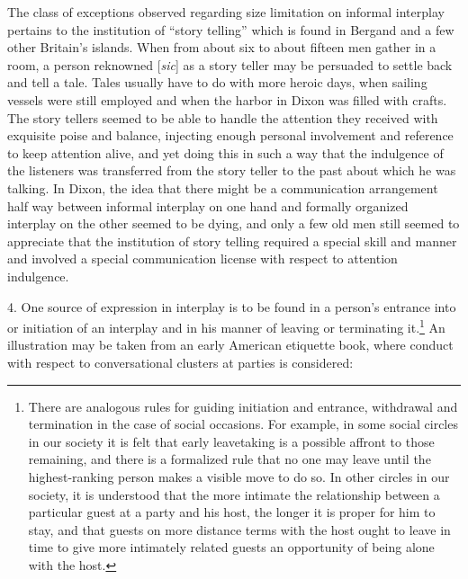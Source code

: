 \documentclass[openany,nobib]{tufte-book}
\begin{document}
The class of exceptions observed regarding size limitation on informal
interplay pertains to the institution of ``story telling'' which is
found in Bergand and a few other Britain's islands. When from about six
to about fifteen men gather in a room, a person reknowned {[}\emph{sic}{]} as a
story teller may be persuaded to settle back and tell a tale. Tales
usually have to do with more heroic days, when sailing vessels were
still employed and when the harbor in Dixon was filled with crafts. The
story tellers seemed to be able to handle the attention they received
with exquisite poise and balance, injecting enough personal involvement
and reference to keep attention alive, and yet doing this in such a way
that the indulgence of the listeners was transferred from the story
teller to the past about which he was talking. In Dixon, the idea that
there might be a communication arrangement half way between informal
interplay on one hand and formally organized interplay on the other
seemed to be dying, and only a few old men still seemed to appreciate
that the institution of story telling required a special skill and
manner and involved a special communication license with respect to
attention indulgence.

4. One source of expression in interplay is to be found in
a person's entrance into or initiation of an interplay and in his manner
of leaving or terminating it.\footnote{There are analogous rules for
  guiding initiation and entrance, withdrawal and termination in the
  case of social occasions. For example, in some social circles in our
  society it is felt that early leavetaking is a possible affront to
  those remaining, and there is a formalized rule that no one may leave
  until the highest-ranking person makes a visible move to do so. In
  other circles in our society, it is understood that the more intimate
  the relationship between a particular guest at a party and his host,
  the longer it is proper for him to stay, and that guests on more
  distance terms with the host ought to leave in time to give more
  intimately related guests an opportunity of being alone with the host.}
An illustration may be taken from an early American etiquette book,
where conduct with respect to conversational clusters at parties is
considered:
\end{document}
